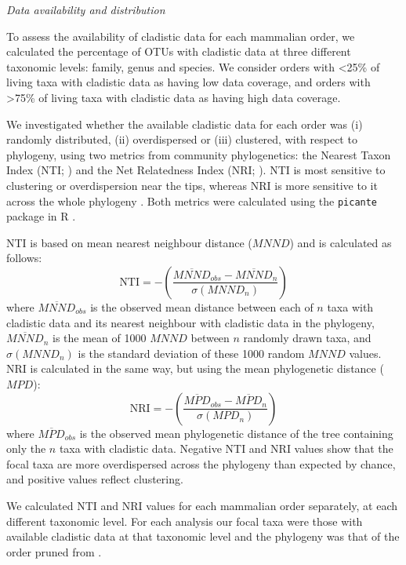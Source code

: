 \documentclass[12pt,letterpaper]{article}
\renewcommand{\subsection}[1]{%
\bigskip
\begin{center}
\begin{large}
\normalfont\itshape #1
\end{large}
\end{center}}
\begin{document}
\subsection{Data availability and distribution}
To assess the availability of cladistic data for each mammalian order, we calculated the percentage of OTUs with cladistic data at three different taxonomic levels: family, genus and species.
We consider orders with \textless 25\% of living taxa with cladistic data as having low data coverage, and orders with \textgreater 75\% of living taxa with cladistic data as having high data coverage. 

We investigated whether the available cladistic data for each order was (i) randomly distributed, (ii) overdispersed or (iii) clustered, with respect to phylogeny, using two metrics from community phylogenetics: the Nearest Taxon Index (NTI; \cite{webb2002phylogenies}) and the Net Relatedness Index (NRI; \cite{webb2002phylogenies}). 
NTI is most sensitive to clustering or overdispersion near the tips, whereas NRI is more sensitive to it across the whole phylogeny \cite{Cooper2008}. 
Both metrics were calculated using the \texttt{picante} package in R \cite{picante,R}.

NTI \cite{webb2002phylogenies} is based on mean nearest neighbour distance ($MNND$) and is calculated as follows:
  \begin{equation}
    \text{NTI}=-\left(\frac{\overline{MNND}_{obs}-\overline{MNND}_{n}}{\sigma(MNND_{n})}\right)
  \end{equation}
where $\overline{MNND}_{obs}$ is the observed mean distance between each of $n$ taxa with cladistic data and its nearest neighbour with cladistic data in the phylogeny, 
$\overline{MNND}_{n}$ is the mean of 1000 $MNND$ between $n$ randomly drawn taxa, and $\sigma(MNND_{n})$ is the standard deviation of these 1000 random $MNND$ values.
NRI is calculated in the same way, but using the mean phylogenetic distance ($MPD$):
  \begin{equation}
    \text{NRI}=-\left(\frac{\overline{MPD}_{obs}-\overline{MPD}_{n}}{\sigma(MPD_{n})}\right)
  \end{equation}
where $\overline{MPD}_{obs}$ is the observed mean phylogenetic distance of the tree containing only the $n$ taxa with cladistic data.
Negative NTI and NRI values show that the focal taxa are more overdispersed across the phylogeny than expected by chance, and positive values reflect clustering.

We calculated NTI and NRI values for each mammalian order separately, at each different taxonomic level. 
For each analysis our focal taxa were those with available cladistic data at that taxonomic level and the phylogeny was that of the order pruned from \cite{BinindaEmonds}.
\end{document}

